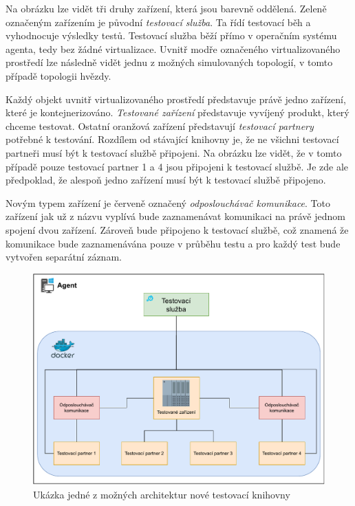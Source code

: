 Na obrázku lze vidět tři druhy zařízení, která jsou barevně oddělená. Zeleně označeným zařízením je původní \textit{testovací služba}. Ta řídí testovací běh a vyhodnocuje výsledky testů. Testovací služba běží přímo v operačním systému agenta, tedy bez žádné virtualizace. Uvnitř modře označeného virtualizovaného prostředí lze následně vidět jednu z možných simulovaných topologií, v tomto případě topologii hvězdy. 

Každý objekt uvnitř virtualizovaného prostředí představuje právě jedno zařízení, které je kontejnerizováno. \textit{Testované zařízení} představuje vyvíjený produkt, který chceme testovat. Ostatní oranžová zařízení představují \textit{testovací partnery} potřebné k testování. Rozdílem od stávající knihovny je, že ne všichni testovací partneři musí být k testovací službě připojeni. Na obrázku lze vidět, že v tomto případě pouze testovací partner 1 a 4 jsou připojeni k testovací službě. Je zde ale předpoklad, že alespoň jedno zařízení musí být k testovací službě připojeno.

Novým typem zařízení je červeně označený \textit{odposlouchávač komunikace}. Toto zařízení jak už z názvu vyplívá bude zaznamenávat komunikaci na právě jednom spojení dvou zařízení. Zároveň bude připojeno k testovací službě, což znamená že komunikace bude zaznamenávána pouze v průběhu testu a pro každý test bude vytvořen separátní záznam.

\begin{figure}[htbp]
    \centering 
    \includegraphics[width=\textwidth]{assets/img/architecture.pdf}
    \caption{Ukázka jedné z možných architektur nové testovací knihovny}
    \label{fig:architecture}
\end{figure}


